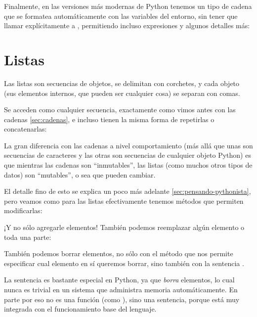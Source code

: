 
Finalmente, en las versiones más modernas de Python tenemos un tipo de cadena que se formatea automáticamente con las variables del entorno, sin tener que llamar explícitamente a , permitiendo incluso expresiones y algunos detalles más:



\section{Listas}

Las listas son secuencias de objetos, se delimitan con corchetes, y cada objeto (sus elementos internos, que pueden ser cualquier cosa) se separan con comas.

Se acceden como cualquier secuencia, exactamente como vimos antes con las cadenas \ref{sec:cadenas}, e incluso tienen la misma forma de repetirlas o concatenarlas:


La gran diferencia con las cadenas a nivel comportamiento (más allá que unas son secuencias de caracteres y las otras son secuencias de cualquier objeto Python) es que mientras las cadenas son ``inmutables'', las listas (como muchos otros tipos de datos) son ``mutables'', o sea que pueden cambiar.

El detalle fino de esto se explica un poco más adelante \ref{sec:pensando-pythonista}, pero veamos como para las listas efectivamente tenemos métodos que permiten modificarlas:


¡Y no sólo agregarle elementos! También podemos reemplazar algún elemento o toda una parte:


También podemos borrar elementos, no sólo con el método que nos permite especificar cual elemento en sí queremos borrar, sino también con la sentencia .


\begin{info}
La sentencia  es bastante especial en Python, ya que \textit{borra} elementos, lo cual nunca es trivial en un sistema que administra memoria automáticamente. En parte por eso no es una función (como ), sino una sentencia, porque está muy integrada con el funcionamiento base del lenguaje.
\end{info}

